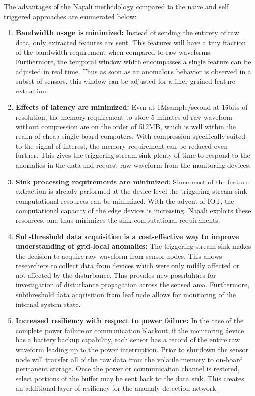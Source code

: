 The advantages of the Napali methodology compared to the naive and self triggered approaches are enumerated below:
\begin{enumerate}
    \item \textbf{Bandwidth usage is minimized:} Instead of sending the entirety of raw data, only extracted features are sent.
    This features will have a tiny fraction of the bandwidth requirement when compared to raw waveforms.
    Furthermore, the temporal window which encompasses a single feature can be adjusted in real time.
    Thus as soon as an anomalous behavior is observed in a subset of sensors, this window can be adjusted for a finer grained feature extraction.

    \item \textbf{Effects of latency are minimized:} Even at 1Msample/second at 16bits of resolution, the memory requirement to store 5 minutes of raw waveform without compression are on the order of 512MB, which is well within the realm of cheap single board computers.
    With compression specifically suited to the signal of interest, the memory requirement can be reduced even further.
    This gives the triggering stream sink plenty of time to respond to the anomalies in the data and request raw waveform from the monitoring devices.

    \item \textbf{Sink processing requirements are minimized:} Since most of the feature extraction is already performed at the device level the triggering stream sink computational resources can be minimized.
    With the advent of IOT, the computational capacity of the edge devices is increasing.
    Napali exploits these resources, and thus minimizes the sink computational requirements.

    \item \textbf{Sub-threshold data acquisition is a cost-effective way to improve understanding of grid-local anomalies:}
    The triggering stream sink makes the decision to acquire raw waveform from sensor nodes.
    This allows researchers to collect data from devices which were only mildly affected or not affected by the disturbance.
    This provides new possibilities for investigation of disturbance propagation across the sensed area.
    Furthermore, subthreshold data acquisition from leaf node allows for monitoring of the internal system state.

    \item \textbf{Increased resiliency with respect to power failure:}
    In the case of the complete power failure or communication blackout, if the monitoring device has a battery backup capability, each sensor has a record of the entire raw waveform leading up to the power interruption.
    Prior to shutdown the sensor node will transfer all of the raw data from the volatile memory to on-board permanent storage.
    Once the power or communication channel is restored, select portions of the buffer may be sent back to the data sink.
    This creates an additional layer of resiliency for the anomaly detection network.


\end{enumerate}
